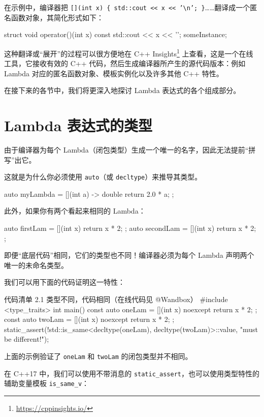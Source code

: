 在示例中，编译器把 \texttt{[](int x) \{ std::cout << x << '\textbackslash n'; \}}……翻译成一个匿名函数对象，其简化形式如下：

\begin{codebox}
struct {
void operator()(int x) const {
std::cout << x << '\n';
}
} someInstance;
\end{codebox}

这种翻译或“展开”的过程可以很方便地在 C++ Insights\footnote{\url{https://cppinsights.io/}} 上查看，这是一个在线工具，它接收有效的 C++ 代码，然后生成编译器所产生的源代码版本：例如 Lambda 对应的匿名函数对象、模板实例化以及许多其他 C++ 特性。

在接下来的各节中，我们将更深入地探讨 Lambda 表达式的各个组成部分。

\section{Lambda 表达式的类型}

由于编译器为每个 Lambda（闭包类型）生成一个唯一的名字，因此无法提前“拼写”出它。

这就是为什么你必须使用 \texttt{auto}（或 \texttt{decltype}）来推导其类型。

\begin{codebox}
auto myLambda = [](int a) -> double { return 2.0 * a; };
\end{codebox}

此外，如果你有两个看起来相同的 Lambda：

\begin{codebox}
auto firstLam
= [](int x) { return x * 2; };
auto secondLam = [](int x) { return x * 2; };
\end{codebox}

即便“底层代码”相同，它们的类型也不同！编译器必须为每个 Lambda 声明两个唯一的未命名类型。

我们可以用下面的代码证明这一特性：

\begin{codeboxt}{代码清单 2.1 类型不同，代码相同（在线代码见 @Wandbox）}
#include <type_traits>
int main() {
const auto oneLam = [](int x) noexcept { return x * 2; };
const auto twoLam = [](int x) noexcept { return x * 2; };
static_assert(!std::is_same<decltype(oneLam), decltype(twoLam)>::value,
"must be different!");
}
\end{codeboxt}

上面的示例验证了 \texttt{oneLam} 和 \texttt{twoLam} 的闭包类型并不相同。


在 C++17 中，我们可以使用不带消息的 \texttt{static\_assert}，也可以使用类型特性的辅助变量模板 \texttt{is\_same\_v}：

